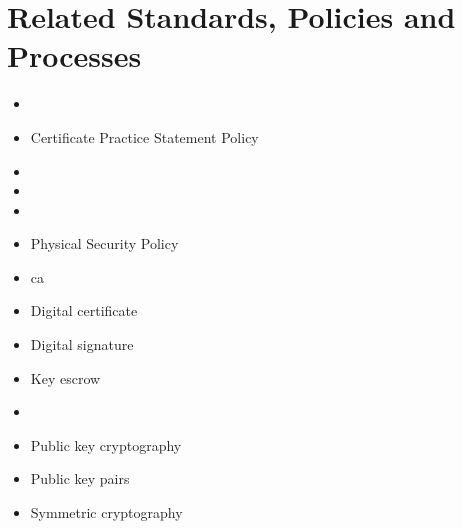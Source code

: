 \section{Related Standards, Policies\oxford{} and Processes}
\begin{itemize}
\item {}%
\item Certificate Practice Statement Policy%
\item {}
\item {}
\item {}
\item Physical Security Policy%
\end{itemize}
\CommonDefinitionsAndTerms
\begin{itemize}
\item \acrfull{ca}
\item Digital certificate
\item Digital signature
\item Key escrow
\item \Plaintext
\item Public key cryptography
\item Public key pairs
\item Symmetric cryptography
\end{itemize}
\CommonRevisionHistory